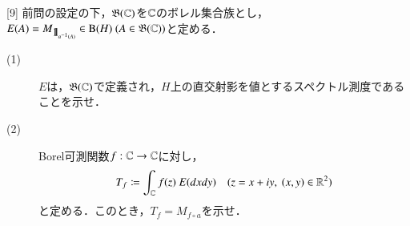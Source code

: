 	
	
\newpage
	\begin{itembox}[l]{[9]}
			前問の設定の下，$\mathfrak{B}(\mathbb{C})$を$\mathbb{C}$のボレル集合族とし，$E(A) = M_{\mbox{1}\hspace{-0.25em}\mbox{l}_{a^{-1}(A)}} \in \mathrm{B}(H) \ (A \in \mathfrak{B}(\mathbb{C}))$と定める．
			\begin{description}
				\item[(1)] $E$は，$\mathfrak{B}(\mathbb{C})$で定義され，$H$上の直交射影を値とするスペクトル測度であることを示せ．
				\item[(2)] Borel可測関数$f:\mathbb{C} \rightarrow \mathbb{C}$に対し，
					\begin{align}
						T_f \coloneqq \int_{\mathbb{C}} f(z)\ E(dxdy) \quad (z = x + iy,\ (x,y) \in \mathbb{R}^2)
					\end{align}
					と定める．このとき，$T_f = M_{f \circ a}$を示せ．
			\end{description}
	\end{itembox}
	
	